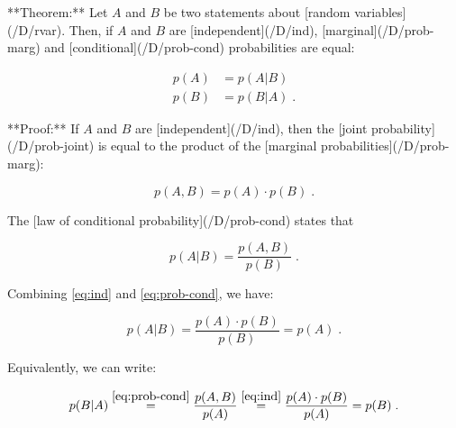 \documentclass[a4paper,12pt]{article}
\begin{document}
**Theorem:** Let $A$ and $B$ be two statements about [random variables](/D/rvar). Then, if $A$ and $B$ are [independent](/D/ind), [marginal](/D/prob-marg) and [conditional](/D/prob-cond) probabilities are equal:

\begin{equation} \label{eq:prob-ind}
\begin{split}
p(A) &= p(A|B) \\
p(B) &= p(B|A) \; .
\end{split}
\end{equation}


**Proof:** If $A$ and $B$ are [independent](/D/ind), then the [joint probability](/D/prob-joint) is equal to the product of the [marginal probabilities](/D/prob-marg):

$$ \label{eq:ind}
p(A,B) = p(A) \cdot p(B) \; .
$$

The [law of conditional probability](/D/prob-cond) states that

$$ \label{eq:prob-cond}
p(A|B) = \frac{p(A,B)}{p(B)} \; .
$$

Combining \eqref{eq:ind} and \eqref{eq:prob-cond}, we have:

$$ \label{eq:prob-ind-qed-A}
p(A|B) = \frac{p(A) \cdot p(B)}{p(B)} = p(A) \; .
$$

Equivalently, we can write:

$$ \label{eq:prob-ind-qed-B}
p(B|A) \overset{\eqref{eq:prob-cond}}{=} \frac{p(A,B)}{p(A)} \overset{\eqref{eq:ind}}{=} \frac{p(A) \cdot p(B)}{p(A)} = p(B) \; .
$$
\end{document}
